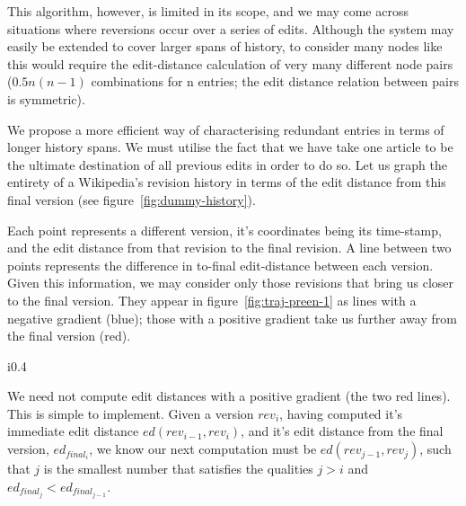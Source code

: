 This algorithm, however, is limited in its scope, and we may come
across situations where reversions occur over a series of
edits. Although the system may easily be extended to cover larger
spans of history, to consider many nodes like this would require the
edit-distance calculation of very many different node pairs
($0.5n(n-1)$ combinations for n entries; the edit distance relation
between pairs is symmetric).

We propose a more efficient way of characterising redundant
entries in terms of longer history spans. We must utilise the fact
that we have take one article to be the ultimate destination of all
previous edits in order to do so. Let us graph the entirety of a
Wikipedia's revision history in terms of the edit distance from this
final version (see figure~\ref{fig:dummy-history}).

Each point represents a different version, it's coordinates being its
time-stamp, and the edit distance from that revision to the final
revision. A line between two points represents the difference in
to-final edit-distance between each version. Given this information,
we may consider only those revisions that bring us closer to the final
version. They appear in figure~\ref{fig:traj-preen-1} as lines with a
negative gradient (blue); those with a positive gradient take us
further away from the final version (red).

\begin{wrapfigure}{i}{0.4\textwidth}
  \centering
  \pgfplotsset{width=0.4\textwidth}
  \caption{Graph showing a `trajectory plot'}
  \label{fig:dummy-history}
\end{wrapfigure}

We need not compute edit distances with a positive gradient (the two
red lines). This is simple to implement. Given a version $rev_i$, having
computed it's immediate edit distance $ed(rev_{i-1},rev_i)$, and it's edit
distance from the final version, $ed_{final_i}$, we know our next
computation must be $ed(rev_{j-1},rev_j)$, such that $j$ is the smallest
number that satisfies the qualities $j > i$ and $ed_{final_j} <
ed_{final_{j-1}}$.

